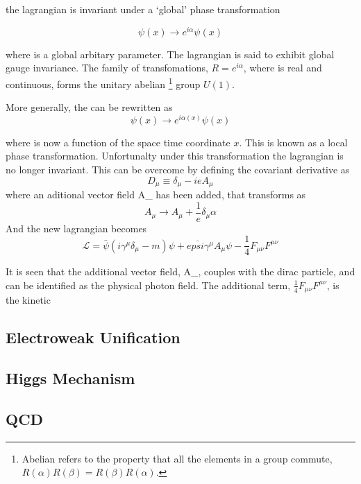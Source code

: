 the lagrangian is invariant under a `global' phase transformation

\begin{equation}
\psi(x) \to e^{i\alpha} \psi(x)
\label{eq:global}
\end{equation}

where \alpha is a global arbitary parameter. The lagrangian is said to exhibit
global gauge invariance. The family of transfomations, $R =
e^{i \alpha}$, where \alpha is real and continuous, forms the unitary
abelian \footnote{Abelian refers to the property that all the elements in a
group commute, $R(\alpha)R(\beta)=R(\beta)R(\alpha)$.}
group $U(1)$. 

More generally, the  can be rewritten as 
\begin{equation}
\psi(x) \to e^{i\alpha(x)} \psi(x)
\label{eq:local}
\end{equation}

where \alpha is now a function of the space time coordinate $x$. This is known
as a local phase transformation. Unfortunalty under this transformation the
lagrangian is no longer invariant. This can be overcome by defining the
covariant derivative as 
\begin{equation}
D_{\mu} \equiv \delta_{\mu} - i e A_{\mu}
\end{equation}
where an aditional vector field A_{\mu} has been added, that transforms as 
\begin{equation}
A_{\mu} \to A_{\mu} + \frac{1}{e} \delta_{\mu} \alpha
\end{equation}
And the new lagrangian becomes
\begin{equation}
\mathcal{L} = 
\bar{\psi}(i\gamma^{\mu}\delta_{\mu} - m)\psi + 
e \bar{psi} \gamma^{\mu} A_{\mu} \psi - 
\frac{1}{4} F_{\mu\nu} F^{\mu\nu}
\end{equation}

It is seen that the additional vector field, A_{\mu}, couples with the dirac
particle, and can be identified as the physical photon field. The additional
term, $\frac{1}{4} F_{\mu\nu} F^{\mu\nu}$, is the kinetic



\subsection{Electroweak Unification}

\subsection{Higgs Mechanism}

\subsection{QCD}



